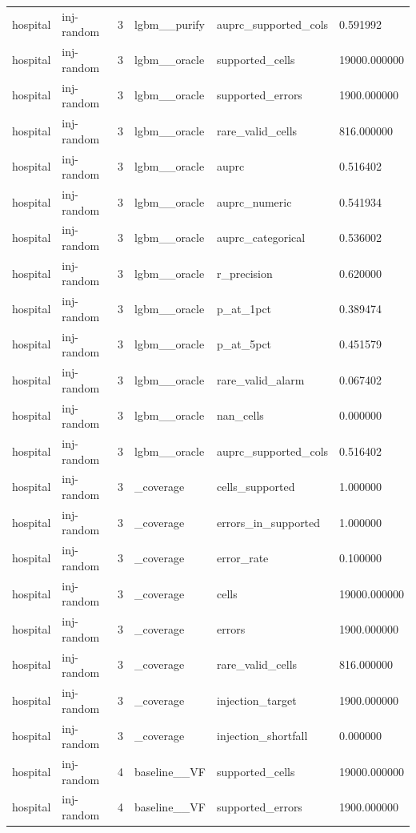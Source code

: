 \begin{tabular}{llllll}
hospital & inj-random & 3 & lgbm\_\_purify & auprc\_supported\_cols & 0.591992 \\
hospital & inj-random & 3 & lgbm\_\_oracle & supported\_cells & 19000.000000 \\
hospital & inj-random & 3 & lgbm\_\_oracle & supported\_errors & 1900.000000 \\
hospital & inj-random & 3 & lgbm\_\_oracle & rare\_valid\_cells & 816.000000 \\
hospital & inj-random & 3 & lgbm\_\_oracle & auprc & 0.516402 \\
hospital & inj-random & 3 & lgbm\_\_oracle & auprc\_numeric & 0.541934 \\
hospital & inj-random & 3 & lgbm\_\_oracle & auprc\_categorical & 0.536002 \\
hospital & inj-random & 3 & lgbm\_\_oracle & r\_precision & 0.620000 \\
hospital & inj-random & 3 & lgbm\_\_oracle & p\_at\_1pct & 0.389474 \\
hospital & inj-random & 3 & lgbm\_\_oracle & p\_at\_5pct & 0.451579 \\
hospital & inj-random & 3 & lgbm\_\_oracle & rare\_valid\_alarm & 0.067402 \\
hospital & inj-random & 3 & lgbm\_\_oracle & nan\_cells & 0.000000 \\
hospital & inj-random & 3 & lgbm\_\_oracle & auprc\_supported\_cols & 0.516402 \\
hospital & inj-random & 3 & \_coverage & cells\_supported & 1.000000 \\
hospital & inj-random & 3 & \_coverage & errors\_in\_supported & 1.000000 \\
hospital & inj-random & 3 & \_coverage & error\_rate & 0.100000 \\
hospital & inj-random & 3 & \_coverage & cells & 19000.000000 \\
hospital & inj-random & 3 & \_coverage & errors & 1900.000000 \\
hospital & inj-random & 3 & \_coverage & rare\_valid\_cells & 816.000000 \\
hospital & inj-random & 3 & \_coverage & injection\_target & 1900.000000 \\
hospital & inj-random & 3 & \_coverage & injection\_shortfall & 0.000000 \\
hospital & inj-random & 4 & baseline\_\_VF & supported\_cells & 19000.000000 \\
hospital & inj-random & 4 & baseline\_\_VF & supported\_errors & 1900.000000 \\

\end{tabular}
